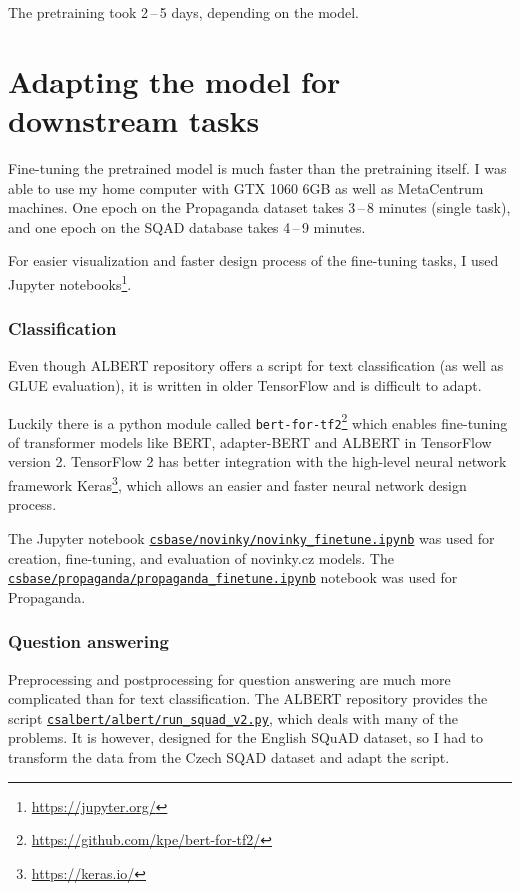 \documentclass[
  printed, %
  color,   %
  table,   %
  oneside, %
  lof,     %
  lot,     %
]{fithesis3}
\begin{document}
 The pretraining took 2\,--\,5 days, depending on the model. 
 

\section{Adapting the model for downstream tasks}
\label{sec:adapting-finetuning}
Fine-tuning the pretrained model is much faster than the pretraining itself. I was able to use my home computer with GTX 1060 6GB as well as MetaCentrum machines. One epoch on the Propaganda dataset takes 3\,--\,8 minutes (single task), and one epoch on the SQAD database takes 4\,--\,9 minutes.

For easier visualization and faster design process of the fine-tuning tasks, I used Jupyter notebooks\footnote{\url{https://jupyter.org/}}.


\subsubsection{Classification}
Even though ALBERT repository offers a script for text classification (as well as GLUE evaluation), it is written in older TensorFlow and is difficult to adapt.

Luckily there is a python module called \texttt{bert-for-tf2}\footnote{\url{https://github.com/kpe/bert-for-tf2/}} which enables fine-tuning of transformer models like BERT, adapter-BERT and ALBERT in TensorFlow version 2. TensorFlow 2 has better integration with the high-level neural network framework Keras\footnote{\url{https://keras.io/}}, which allows an easier and faster neural network design process. 

The Jupyter notebook \href{https://github.com/ZepZep/csalbert/blob/master/novinky/novinky_finetune.ipynb}{\texttt{csbase/novinky/novinky\_finetune.ipynb}} was used for creation, fine-tuning, and evaluation of novinky.cz models. The \href{https://github.com/ZepZep/csalbert/blob/master/propaganda/propaganda_finetune.ipynb}{\texttt{csbase/propaganda/propaganda\_finetune.ipynb}} notebook was used for Propaganda.

\subsubsection{Question answering}
Preprocessing and postprocessing for question answering are much more complicated than for text classification. The ALBERT repository provides the script \href{https://github.com/ZepZep/csalbert/blob/master/albert/run_squad_v2.py}{\texttt{csalbert/albert/run\_squad\_v2.py}}, which deals with many of the problems. It is however, designed for the English SQuAD dataset, so I had to transform the data from the Czech SQAD dataset and adapt the script.
\end{document}
